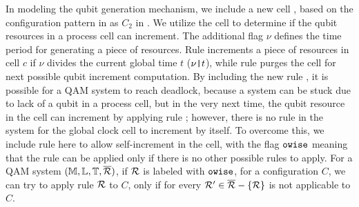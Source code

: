 In modeling the qubit generation mechanism, we include a new cell ,
 based on the configuration pattern in  as $C_2$ in .
We utilize the cell to determine if the qubit resources in a process cell can increment.
The additional flag $\nu$ defines the time period for generating a piece of resources.
Rule  increments a piece of resources in cell $c$ if $\nu$ divides the current global time $t$ ($\nu \texttt{|} t$),
while rule  purges the  cell for next possible qubit increment computation.
By including the new rule , it is possible for a QAM system to reach deadlock,
because a system can be stuck due to lack of a qubit in a process cell, but in the very next time, the qubit resource in the cell can increment by applying rule ; however, there is no rule in the system for the global clock cell  to increment by itself.
To overcome this, we include rule  here to allow self-increment in the  cell, 
with the flag $\texttt{owise}$ meaning that the rule can be applied only if there is no other possible rules to apply.
For a QAM system $(\mathbb{M},\mathbb{L},\mathbb{T},\overline{\mathcal{R}})$, if $\mathcal{R}$ is labeled with $\texttt{owise}$,
for a configuration $C$, we can try to apply rule $\mathcal{R}$ to $C$, only if for every $\mathcal{R}' \in \overline{\mathcal{R}} - \{\mathcal{R}\}$ is not applicable to $C$.




